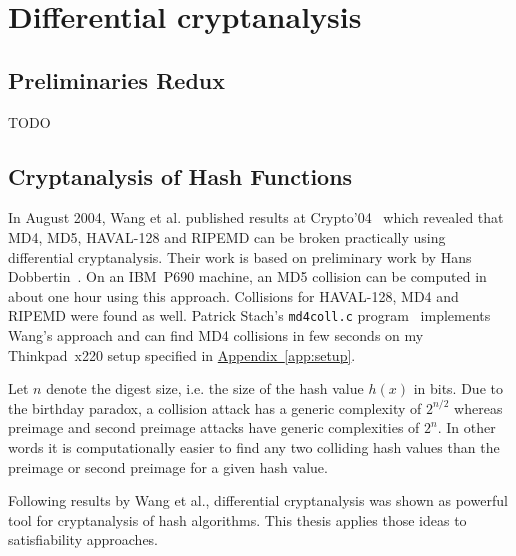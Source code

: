 \renewcommand*\chappic{img/diff-crypt.pdf}
\renewcommand*\chapquote{Just because it's automatic doesn't mean it works.}
\renewcommand*\chapquotesrc{Daniel J. Bernstein}
%
\chapter{Differential cryptanalysis}
\label{ch:dc}
%
\section{Preliminaries Redux}
\label{sec:crypto-prelim}
%
TODO

\section{Cryptanalysis of Hash Functions}
\label{sec:intro-cryptanalysis}
%
In August 2004, Wang et al. published results at Crypto'04~\cite{wang2004} which revealed
that MD4, MD5, HAVAL-128 and RIPEMD can be broken practically using differential cryptanalysis.
Their work is based on preliminary work by Hans Dobbertin~\cite{Dobbertin1998}.
On an IBM~P690 machine, an MD5 collision can be computed in about one hour using this approach.
Collisions for HAVAL-128, MD4 and RIPEMD were found as well. Patrick Stach's \texttt{md4coll.c}
program~\cite{md4coll} implements Wang's approach and can find MD4 collisions in few seconds
on my Thinkpad~x220 setup specified in \hyperref[app:setup]{Appendix~\ref{app:setup}}.

Let $n$ denote the digest size, i.e. the size of the hash value $h(x)$ in bits.
Due to the birthday paradox, a collision attack has a generic complexity of $2^{n/2}$
whereas preimage and second preimage attacks have generic complexities of $2^n$.
In other words it is computationally easier to find any two colliding hash values
than the preimage or second preimage for a given hash value.

Following results by Wang et al., differential cryptanalysis was shown as
powerful tool for cryptanalysis of hash algorithms. This thesis applies those
ideas to satisfiability approaches.

